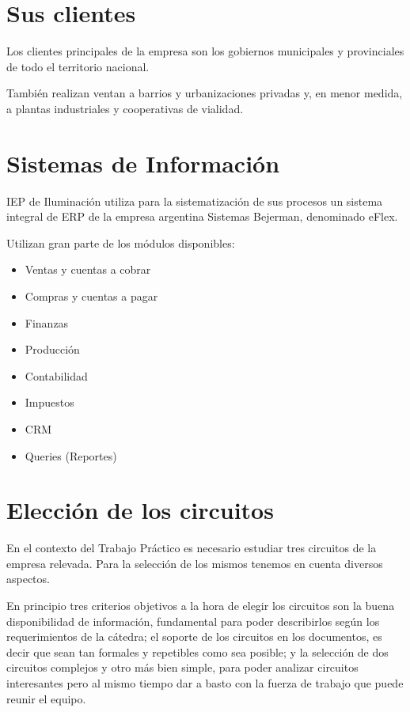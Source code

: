 \documentclass[12pt,titlepage]{article}
\begin{document}
\section{Sus clientes}
Los clientes principales de la empresa son los gobiernos municipales y provinciales de todo el territorio nacional.

Tambi\'en realizan ventan a barrios y urbanizaciones privadas y, en menor medida, a plantas industriales y cooperativas de vialidad.

\section{Sistemas de Informaci\'on}

IEP de Iluminaci\'on utiliza para la sistematizaci\'on de sus procesos un sistema integral de ERP de la empresa argentina Sistemas Bejerman, denominado eFlex.

Utilizan gran parte de los m\'odulos disponibles:

\begin{itemize}
\item Ventas y cuentas a cobrar
\item Compras y cuentas a pagar
\item Finanzas
\item Producci\'on
\item Contabilidad
\item Impuestos
\item CRM
\item Queries (Reportes)
\end{itemize}

\section{Elecci\'on de los circuitos}

En el contexto del Trabajo Pr\'actico es necesario estudiar tres circuitos de la empresa relevada. Para la selecci\'on de los mismos tenemos en cuenta diversos aspectos.

En principio tres criterios objetivos a la hora de elegir los circuitos son la buena disponibilidad de informaci\'on, fundamental para poder describirlos seg\'un los requerimientos de la c\'atedra; el soporte de los circuitos en los documentos, es decir que sean tan formales y repetibles como sea posible; y la selecci\'on de dos circuitos complejos y otro m\'as bien simple, para poder analizar circuitos interesantes pero al mismo tiempo dar a basto con la fuerza de trabajo que puede reunir el equipo.
\end{document}

